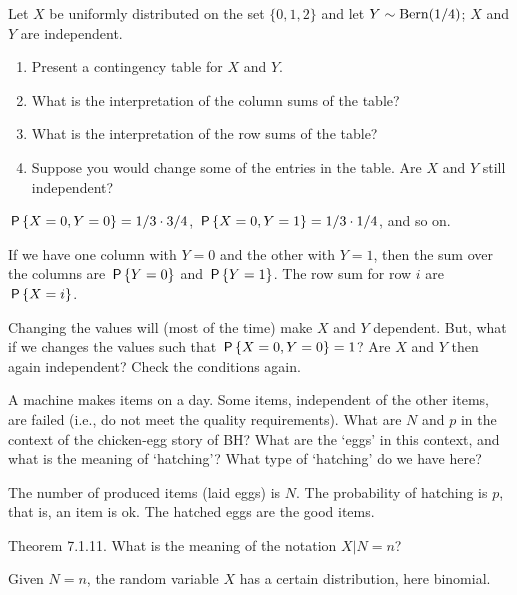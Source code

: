 \begin{exercise}
Let $X$ be uniformly distributed on the set $\{0,1,2\}$ and let $Y \sim \Bern{1/4}$; $X$ and $Y$ are independent.
\begin{enumerate}
\item Present a contingency table for $X$ and $Y$.
\item What is the interpretation of the column sums of the table?
\item What is the interpretation of the row sums of the table?
\item Suppose you would change some of the entries in the table. Are $X$ and $Y$ still independent?
\end{enumerate}
\begin{solution}
$\P{X=0, Y=0} = 1/3 \cdot 3/4$,
$\P{X=0, Y=1} = 1/3 \cdot 1/4$, and so on.

If we have one column with $Y=0$ and the other with $Y=1$, then the sum over the columns are $\P{Y=0}$ and $\P{Y=1}$. The row sum for row $i$ are  $\P{X=i}$.

Changing the values will (most of the time) make $X$ and $Y$ dependent. But, what if we changes the values such that  $\P{X=0, Y=0} =1$? Are $X$ and $Y$ then again independent? Check the conditions again.
\end{solution}
\end{exercise}


\begin{exercise}
A machine makes items on a day.
Some items, independent of the other items, are failed (i.e., do not meet the quality requirements).
What are $N$ and  $p$ in the context of the chicken-egg story of BH? What are the `eggs' in this context, and what is the meaning of `hatching'?
What type of `hatching' do we have here?
\begin{solution}
  The number of produced items (laid eggs) is $N$. The probability of hatching is $p$, that is, an item is ok. The hatched eggs are the good items.
\end{solution}
\end{exercise}



\begin{exercise}
Theorem 7.1.11. What is the meaning of the notation $X|N=n$?
\begin{solution}
  Given $N=n$, the random variable $X$ has a certain distribution, here binomial.
\end{solution}
\end{exercise}






